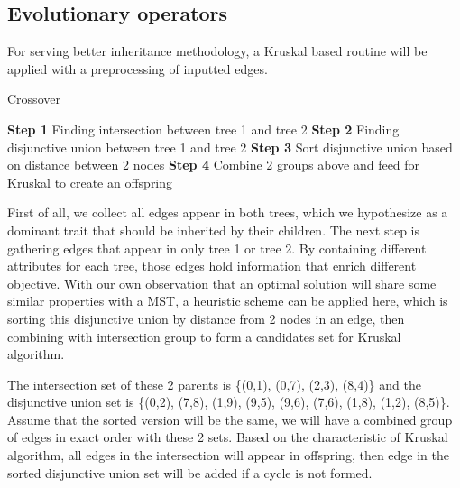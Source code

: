 \subsection{Evolutionary operators}
For serving better inheritance methodology, a Kruskal based routine will be applied with a preprocessing of inputted edges.

\begin{algorithm}
\caption{Crossover}
\begin{algorithmic}[0]
\State \textbf{Step 1} Finding intersection between tree 1 and tree 2
\State \textbf{Step 2} Finding disjunctive union between tree 1 and tree 2
\State \textbf{Step 3} Sort disjunctive union based on distance between 2 nodes
\State \textbf{Step 4} Combine 2 groups above and feed for Kruskal to create an offspring
\end{algorithmic}
\end{algorithm}

First of all, we collect all edges appear in both trees, which we hypothesize as a dominant trait that should be inherited by their children. The next step is gathering edges that appear in only tree 1 or tree 2. By containing different attributes for each tree, those edges hold information that enrich different objective. With our own observation that an optimal solution will share some similar properties with a MST, a heuristic scheme can be applied here, which is sorting this disjunctive union by distance from 2 nodes in an edge, then combining with intersection group to form a candidates set for Kruskal algorithm.

\noindent{}

The intersection set of these 2 parents is \{(0,1), (0,7), (2,3), (8,4)\} and the disjunctive union set is \{(0,2), (7,8), (1,9), (9,5), (9,6), (7,6), (1,8), (1,2), (8,5)\}. Assume that the sorted version will be the same, we will have a combined group of edges in exact order with these 2 sets. Based on the characteristic of Kruskal algorithm, all edges in the intersection will appear in offspring, then edge in the sorted disjunctive union set will be added if a cycle is not formed.

